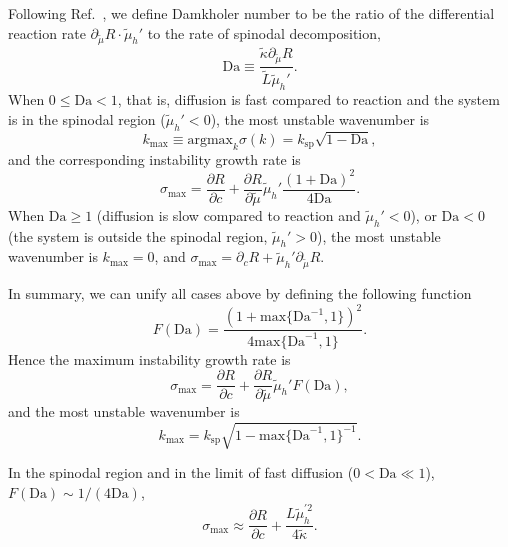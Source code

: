 \documentclass[reprint,aps,pre,superscriptaddress]{revtex4-2}
\newcommand{\pderiv}[2]{\frac{\partial {#1}}{\partial {#2}}}
\begin{document}
Following Ref.~\cite{Bazant2017}, we define Damkholer number to be the ratio of the differential reaction rate $\partial_{\tilde{\mu}} R \cdot \tilde{\mu}_h'$ to the rate of spinodal decomposition,
\begin{equation}
  \text{Da} \equiv \frac{\tilde{\kappa} \partial_{\tilde{\mu}} R}{\tilde{L} \tilde{\mu}_h'}.
\end{equation}
When $0 \leq \text{Da}<1$, that is, diffusion is fast compared to reaction and the system is in the spinodal region ($\tilde{\mu}_h'<0$), the most unstable wavenumber is
\begin{equation}
  k_\text{max} \equiv \text{argmax}_{k} \sigma(k) = k_\text{sp} \sqrt{1-\text{Da}},
\end{equation}
and the corresponding instability growth rate is
\begin{equation}
  \sigma_\text{max} = \pderiv{R}{c} + \pderiv{R}{\tilde{\mu}}\tilde{\mu}_h' \frac{(1+\text{Da})^2}{4\text{Da}}.
\end{equation}
When $\text{Da} \geq 1$ (diffusion is slow compared to reaction and $\tilde{\mu}_h'<0$), or $\text{Da}<0$ (the system is outside the spinodal region, $\tilde{\mu}_h'>0$),
the most unstable wavenumber is $k_\text{max}=0$, and $\sigma_\text{max} = \partial_c R + \tilde{\mu}_h' \partial_{\tilde{\mu}} R$.

In summary, we can unify all cases above by defining the following function
\begin{equation}
  F(\text{Da}) = \frac{(1+ \text{max} \{ \text{Da}^{-1},1\} )^2}{4 \text{max} \{ \text{Da}^{-1},1 \} }.
\end{equation}
Hence the maximum instability growth rate is
\begin{equation} \label{eqn::sigma_max}
  \sigma_\text{max} = \pderiv{R}{c} + \pderiv{R}{\tilde{\mu}} \tilde{\mu}_h' F(\text{Da}),
\end{equation}
and the most unstable wavenumber is
\begin{equation} \label{eqn::k_max}
  k_\text{max} = k_\text{sp} \sqrt{1-\text{max}\{\text{Da}^{-1},1\}^{-1}}.
\end{equation}

In the spinodal region and in the limit of fast diffusion ($0<\text{Da} \ll 1$), $F(\text{Da}) \sim 1/(4\text{Da})$,
\begin{equation} \label{eqn::fast_diffusion}
  \sigma_\text{max} \approx \pderiv{R}{c} + \frac{L \tilde{\mu}_h^{\prime 2}}{4\tilde{\kappa}}.
\end{equation}
\end{document}
